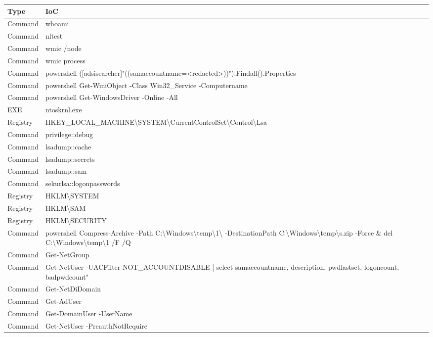 \begin{longtable}[H]{|C{0.15\textwidth}|C{0.85\textwidth}|}
\hline \textbf{Type} & \textbf{IoC} \\ \hline
 Command & whoami\\ \hline
 Command & nltest\\ \hline
 Command & wmic /node\\ \hline
 Command & wmic process\\ \hline
 Command & powershell ([adsisearcher]"((samaccountname=<redacted>))").Findall().Properties\\ \hline
 Command & powershell Get-WmiObject -Class Win32\_Service -Computername\\ \hline
 Command & powershell Get-WindowsDriver -Online -All\\ \hline
 EXE & ntoskrnl.exe\\ \hline
 Registry & HKEY\_LOCAL\_MACHINE\textbackslash{}SYSTEM\textbackslash{}CurrentControlSet\textbackslash{}Control\textbackslash{}Lsa\\ \hline
 Command & privilege::debug\\ \hline
 Command & lsadump::cache\\ \hline
 Command & lsadump::secrets\\ \hline
 Command & lsadump::sam\\ \hline
 Command & sekurlsa::logonpasswords\\ \hline
 Registry & HKLM\textbackslash{}SYSTEM\\ \hline
 Registry & HKLM\textbackslash{}SAM\\ \hline
 Registry & HKLM\textbackslash{}SECURITY\\ \hline
 Command & powershell Compress-Archive -Path C:\textbackslash{}Windows\textbackslash{}temp\textbackslash{}1\textbackslash{} -DestinationPath C:\textbackslash{}Windows\textbackslash{}temp\textbackslash{}s.zip -Force \& del C:\textbackslash{}Windows\textbackslash{}temp\textbackslash{}1 /F /Q\\ \hline
 Command & Get-NetGroup\\ \hline
 Command & Get-NetUser -UACFilter NOT\_ACCOUNTDISABLE | select samaccountname, description, pwdlastset, logoncount, badpwdcount"\\ \hline
 Command & Get-NetDiDomain\\ \hline
 Command & Get-AdUser\\ \hline
 Command & Get-DomainUser -UserName\\ \hline
 Command & Get-NetUser -PreauthNotRequire\\ \hline

\end{longtable}
